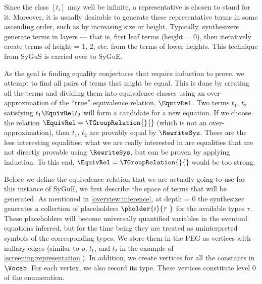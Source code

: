 Since the class $\left[t_i\right]$ may well be infinite, a representative is chosen
to stand for it.
Moreover, it is usually desirable to generate these representative terms in some
ascending order, such as by increasing size or height.
Typically, synthesizers generate terms in layers --- that is, first leaf terms
(height = 0), then iteratively create terms of height = 1, 2, etc. from the terms
of lower heights.
This technique from SyGuS is carried over to SyGuE.

\medskip

As the goal is finding equality conjectures that require induction to prove, we attempt to find all pairs of terms that might be equal.
This is done by creating all the terms and dividing them into equivalence classes using an over-approximation of the ``true'' equivalence relation, $\EquivRel$.
Two terms $t_1$, $t_2$ satisfying $t_1 \EquivRel t_2$ will form a candidate for a new equation.
If we choose the relation $\EquivRel = {\TGroupRelation{}{}}\!$ (which is not an over-approximation), then $t_1$, $t_2$ are provably
equal by $\RewriteSys$.
These are the less interesting equalities: what we are really interested in
are equalities that are not directly provable using $\RewriteSys$,
but can be proven by applying induction.
To this end, $\EquivRel = {\TGroupRelation{}{}}\!$ would be too strong.

Before we define the equivalence relation that we are actually going to use for this instance of SyGuE, we first describe the space of terms that will be generated.
As mentioned in \autoref{overview:inference}, at depth = 0 the synthesizer generates
a collection of placeholders $\pholder{i}{\tau~}$ for the available types $\tau$.
These placeholders will become universally quantified variables in the eventual
equations inferred, but for the time being they are treated as uninterpreted symbols
of the corresponding types.
We store them in the PEG as vertices with nullary edges (similar to $p$, $l_1$, and
$l_2$ in the example of \autoref{screening:representation}).
In addition, we create vertices for all the constants in $\Vocab$.
For each vertex, we also record its type.
These vertices constitute level 0 of the enumeration.

